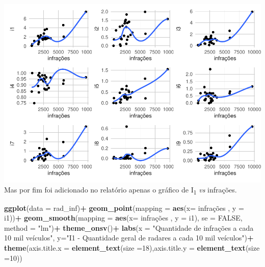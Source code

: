 \documentclass[
]{book}
\newenvironment{Shaded}{\begin{snugshade}}{\end{snugshade}}
\newcommand{\AttributeTok}[1]{\textcolor[rgb]{0.13,0.29,0.53}{#1}}
\newcommand{\ConstantTok}[1]{\textcolor[rgb]{0.56,0.35,0.01}{#1}}
\newcommand{\DecValTok}[1]{\textcolor[rgb]{0.00,0.00,0.81}{#1}}
\newcommand{\FunctionTok}[1]{\textcolor[rgb]{0.13,0.29,0.53}{\textbf{#1}}}
\newcommand{\NormalTok}[1]{#1}
\newcommand{\SpecialCharTok}[1]{\textcolor[rgb]{0.81,0.36,0.00}{\textbf{#1}}}
\newcommand{\StringTok}[1]{\textcolor[rgb]{0.31,0.60,0.02}{#1}}
\begin{document}
\includegraphics{RelatorioVelocidades_files/figure-latex/unnamed-chunk-23-1.pdf}
Mas por fim foi adicionado no relatório apenas o gráfico de I\textsubscript{1} \emph{vs} infrações.

\begin{Shaded}
\begin{Highlighting}[]
\FunctionTok{ggplot}\NormalTok{(}\AttributeTok{data =}\NormalTok{ rad\_inf)}\SpecialCharTok{+}
  \FunctionTok{geom\_point}\NormalTok{(}\AttributeTok{mapping =} \FunctionTok{aes}\NormalTok{(}\AttributeTok{x=}\NormalTok{ infrações , }\AttributeTok{y =}\NormalTok{ i1))}\SpecialCharTok{+}
  \FunctionTok{geom\_smooth}\NormalTok{(}\AttributeTok{mapping =} \FunctionTok{aes}\NormalTok{(}\AttributeTok{x=}\NormalTok{ infrações , }\AttributeTok{y =}\NormalTok{ i1), }\AttributeTok{se =} \ConstantTok{FALSE}\NormalTok{, }\AttributeTok{method =} \StringTok{"lm"}\NormalTok{)}\SpecialCharTok{+}
  \FunctionTok{theme\_onsv}\NormalTok{()}\SpecialCharTok{+}
  \FunctionTok{labs}\NormalTok{(}\AttributeTok{x =} \StringTok{"Quantidade de infrações a cada 10 mil veículos"}\NormalTok{, }\AttributeTok{y=}\StringTok{"I1 {-} Quantidade geral de radares a cada 10 mil veículos"}\NormalTok{)}\SpecialCharTok{+}
  \FunctionTok{theme}\NormalTok{(}\AttributeTok{axis.title.x =} \FunctionTok{element\_text}\NormalTok{(}\AttributeTok{size =}\DecValTok{18}\NormalTok{),}\AttributeTok{axis.title.y =} \FunctionTok{element\_text}\NormalTok{(}\AttributeTok{size =}\DecValTok{10}\NormalTok{))}
\end{Highlighting}
\end{Shaded}
\end{document}
